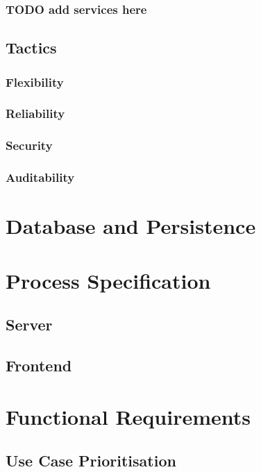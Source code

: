 \documentclass{article}
\begin{document}
\subsubsection{TODO add services here}

\subsection{Tactics}

\subsubsection{Flexibility}

\subsubsection{Reliability}

\subsubsection{Security}

\subsubsection{Auditability}

\section{Database and Persistence}

\section{Process Specification}

\subsection{Server}

\subsection{Frontend}

\section{Functional Requirements}

\subsection{Use Case Prioritisation}
\end{document}
